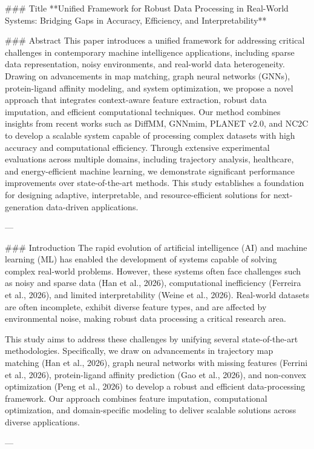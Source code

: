 ### Title
**Unified Framework for Robust Data Processing in Real-World Systems: Bridging Gaps in Accuracy, Efficiency, and Interpretability**

### Abstract
This paper introduces a unified framework for addressing critical challenges in contemporary machine intelligence applications, including sparse data representation, noisy environments, and real-world data heterogeneity. Drawing on advancements in map matching, graph neural networks (GNNs), protein-ligand affinity modeling, and system optimization, we propose a novel approach that integrates context-aware feature extraction, robust data imputation, and efficient computational techniques. Our method combines insights from recent works such as DiffMM, GNNmim, PLANET v2.0, and NC2C to develop a scalable system capable of processing complex datasets with high accuracy and computational efficiency. Through extensive experimental evaluations across multiple domains, including trajectory analysis, healthcare, and energy-efficient machine learning, we demonstrate significant performance improvements over state-of-the-art methods. This study establishes a foundation for designing adaptive, interpretable, and resource-efficient solutions for next-generation data-driven applications.

---

### Introduction
The rapid evolution of artificial intelligence (AI) and machine learning (ML) has enabled the development of systems capable of solving complex real-world problems. However, these systems often face challenges such as noisy and sparse data (Han et al., 2026), computational inefficiency (Ferreira et al., 2026), and limited interpretability (Weine et al., 2026). Real-world datasets are often incomplete, exhibit diverse feature types, and are affected by environmental noise, making robust data processing a critical research area.

This study aims to address these challenges by unifying several state-of-the-art methodologies. Specifically, we draw on advancements in trajectory map matching (Han et al., 2026), graph neural networks with missing features (Ferrini et al., 2026), protein-ligand affinity prediction (Gao et al., 2026), and non-convex optimization (Peng et al., 2026) to develop a robust and efficient data-processing framework. Our approach combines feature imputation, computational optimization, and domain-specific modeling to deliver scalable solutions across diverse applications.

---


